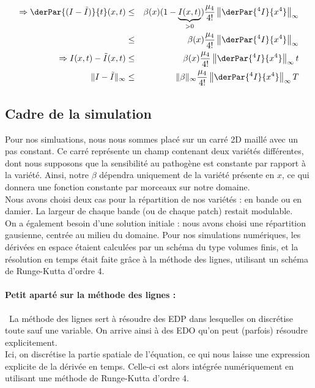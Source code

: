 \documentclass{article}
\begin{document}
\begin{eqnarray*}
\Rightarrow	\derPar{(I-\tilde{I})}{t}(x,t)&\leq&\beta(x)(1-\underbrace{I(x,t)}_{>0})\frac{\mu_4}{4!}\left\|\derPar{{}^4I}{x^4}\right\|_{\infty} \\
			&\leq& \beta(x)\frac{\mu_4}{4!}\left\|\derPar{{}^4I}{x^4}\right\|_{\infty} \\
\Rightarrow I(x,t)-\tilde{I}(x,t)&\leq& \beta(x) \frac{\mu_4}{4!} \left\|\derPar{{}^4I}{x^4}\right\|_{\infty} t \\
	\|I-\tilde{I}\|_{\infty}&\leq& \|\beta\|_{\infty}\frac{\mu_4}{4!} \left\|\derPar{{}^4I}{x^4}\right\|_{\infty} T \\
\end{eqnarray*}

\subsection{Cadre de la simulation}
Pour nos simluations, nous nous sommes placé sur un carré 2D maillé avec un pas constant. Ce carré représente un champ contenant deux variétés différentes, dont nous supposons que la sensibilité au pathogène est constante par rapport à la variété. Ainsi, notre $\beta$ dépendra uniquement de la variété présente en $x$, ce qui donnera une fonction constante par morceaux sur notre domaine.\\
Nous avons choisi deux cas pour la répartition de nos variétés : en bande ou en damier. La largeur de chaque bande (ou de chaque patch) restait modulable.\\
On a également besoin d'une solution initiale : nous avons choisi une répartition gausienne, centrée au milieu du domaine.
Pour nos simulations numériques, les dérivées en espace étaient calculées par un schéma du type volumes finis, et la résolution en temps était faite grâce à la méthode des lignes, utilisant un schéma de Runge-Kutta d'ordre 4.\\
\paragraph{Petit aparté sur la méthode des lignes :} La méthode des lignes sert à résoudre des EDP dans lesquelles on discrétise toute sauf une variable. On arrive ainsi à des EDO qu'on peut (parfois) résoudre explicitement.\\
Ici, on discrétise la partie spatiale de l'équation, ce qui nous laisse une expression explicite de la dérivée en temps. Celle-ci est alors intégrée numériquement en utilisant une méthode de Runge-Kutta d'ordre 4.
\end{document}

